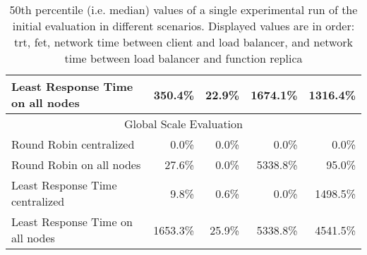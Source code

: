 \begin{table}[]
\begin{tabular}{lrrrr}
Least Response Time on all nodes & 350.4\%                          & 22.9\%                           & 1674.1\%                               & 1316.4\%                               \\ \hline
\multicolumn{5}{c}{Global Scale Evaluation}                                                                                                                                              \\ \hline
Round Robin centralized          & 0.0\%                            & 0.0\%                            & 0.0\%                                  & 0.0\%                                  \\
Round Robin on all nodes         & 27.6\%                           & 0.0\%                            & 5338.8\%                               & 95.0\%                                 \\
Least Response Time centralized  & 9.8\%                            & 0.6\%                            & 0.0\%                                  & 1498.5\%                               \\
Least Response Time on all nodes & 1653.3\%                         & 25.9\%                           & 5338.8\%                               & 4541.5\%                               \\ \hline
\end{tabular}
\caption{50th percentile (i.e. median) values of a single experimental run of the initial evaluation in different scenarios. Displayed values are in order: \gls{trt}, \gls{fet}, network time between client and load balancer, and network time between load balancer and function replica}
\label{tab:initial_eval_results_q50}
\end{table}